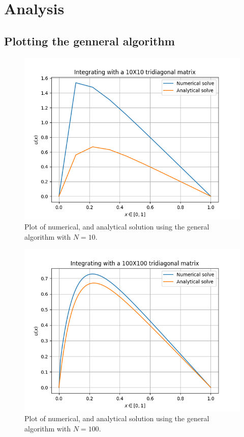 \documentclass[english,notitlepage]{revtex4-1}  %
\begin{document}
\section{Analysis}\label{sec:4}

\subsection{Plotting the genneral algorithm}\label{subsec:41}
\begin{figure}[H]
	\centering
	\label{fig:411}
	\includegraphics[width=\columnwidth]{../figures/NumVsAnal10x10.png}
	\caption{Plot of numerical, and analytical solution using the general algorithm with
	\(N=10\).}
\end{figure}

\begin{figure}[H]
	\centering
	\label{fig:412}
	\includegraphics[width=\columnwidth]{../figures/NumVsAnal100x100.png}
	\caption{Plot of numerical, and analytical solution using the general algorithm with
	\(N=100\).}
\end{figure}
\end{document}
